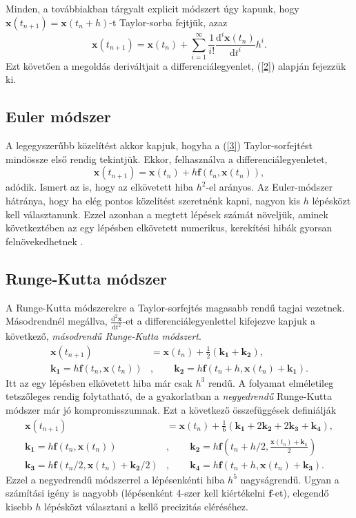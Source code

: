 \documentclass[12pt]{article}
\theoremstyle{plain}
\newcommand{\xvec}{\mathbf{x}}
\begin{document}
Minden, a továbbiakban tárgyalt explicit módszert úgy kapunk, hogy $\xvec(t_{n+1})=\xvec(t_n + h)$-t Taylor-sorba fejtjük, azaz
\begin{equation}
\label{3}
    \xvec(t_{n+1}) = \xvec(t_n) + \sum_{i=1}^{\infty} \frac{1}{i!}\frac{\text{d}^i \xvec(t_n)}{\text{d}t^i}h^i.
\end{equation}
Ezt követően a megoldás deriváltjait a differenciálegyenlet, (\ref{2}) alapján fejezzük ki. 
\subsection{Euler módszer}
A legegyszerűbb közelítést akkor kapjuk, hogyha a (\ref{3}) Taylor-sorfejtést mindössze első rendig tekintjük. Ekkor, felhasználva a differenciálegyenletet,
\begin{equation}
    \label{euler}
    \xvec(t_{n+1}) = \xvec(t_n) + h\mathbf{f}(t_n, \xvec(t_n)),
\end{equation}
adódik. Ismert az is, hogy az elkövetett hiba $h^2$-el arányos. Az Euler-módszer hátránya, hogy ha elég pontos közelítést szeretnénk kapni, nagyon kis $h$ lépésközt kell választanunk. Ezzel azonban a megtett lépések számát növeljük, aminek következtében az egy lépésben elkövetett numerikus, kerekítési hibák gyorsan felnövekedhetnek \cite{landau}. 
\subsection{Runge-Kutta módszer}
A Runge-Kutta módszerekre a Taylor-sorfejtés magasabb rendű tagjai vezetnek. Másodrendnél megállva, $\frac{\text{d}^2\xvec}{\text{d}t^2}$-et a differenciálegyenlettel kifejezve kapjuk a következő, {\em másodrendű Runge-Kutta módszert}. 
\begin{align}
    \xvec(t_{n+1}) &= \xvec(t_n) +  \frac{1}{2}(\mathbf{k_1} + \mathbf{k_2}), \\
    \mathbf{k_1} = h \mathbf{f}(t_n, \xvec(t_n))&,   \qquad   \mathbf{k_2} = h \mathbf{f}(t_n+h, \xvec(t_n) + \mathbf{k_1}).
\end{align}
Itt az egy lépésben elkövetett hiba már csak $h^3$ rendű. A folyamat elméletileg tetszőleges rendig folytatható, de a gyakorlatban a {\em negyedrendű} Runge-Kutta módszer már jó kompromisszumnak. Ezt a következő összefüggések definiálják 
\begin{align}
    \xvec(t_{n+1}) &= \xvec(t_n) +  \frac{1}{6}(\mathbf{k_1} + 2\mathbf{k_2} + 2\mathbf{k_3} + \mathbf{k_4}), \\
    \mathbf{k_1} = h \mathbf{f}(t_n, \xvec(t_n))&,   \qquad   \mathbf{k_2} = h \mathbf{f}\left(t_n+h/2, \frac{\xvec(t_n)+ \mathbf{k_1}}{2}\right) \\
    \mathbf{k_3} = h \mathbf{f}(t_n/2, \xvec(t_n)+ \mathbf{k_2}/2)&,   \qquad   \mathbf{k_4} = h \mathbf{f}(t_n+h, \xvec(t_n)+ \mathbf{k_3}).
\end{align}
Ezzel a negyedrendű módszerrel a lépésenkénti hiba $h^5$ nagyságrendű. Ugyan a számítási igény is nagyobb (lépésenként 4-szer kell kiértékelni $\mathbf{f}$-et), elegendő kisebb $h$ lépésközt választani a kellő precizitás eléréséhez. 
\end{document}
